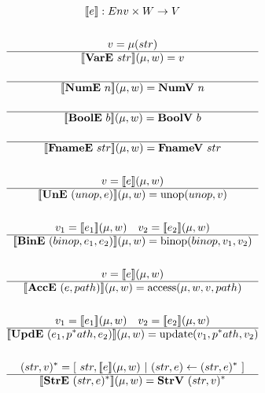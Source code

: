 \begin{gather*}
  \sem{e} : Env \times W \rightarrow V \\
%
\newline \\
  v = \mu(str) \\
  \hline
  \sem{\vare ~ str}(\mu, w) = v \\
%
\newline \\
  \hline
  \sem{\nume ~ n}(\mu, w) = \numv ~ n \\
%
\newline \\
  \hline
  \sem{\boole ~ b}(\mu, w) = \boolv ~ b \\
%
\newline \\
  \hline
  \sem{\fnamee ~ str}(\mu, w) = \fnamev ~ str \\
%
\newline \\
  v = \sem{e}(\mu, w) \\
  \hline
  \sem{\une ~ (unop, e)}(\mu, w) = \unop(unop, v) \\
%
\newline \\
  v_1 = \sem{e_1}(\mu, w) \quad v_2 = \sem{e_2}(\mu, w) \\
  \hline
  \sem{\bine ~ (binop, e_1, e_2)}(\mu, w) = \binop(binop, v_1, v_2) \\
%
\newline \\
  v = \sem{e}(\mu, w) \\
  \hline
  \sem{\acce ~ (e, path)}(\mu, w) = \access(\mu, w, v, path) \\
%
\newline \\
  v_1 = \sem{e_1}(\mu, w) \quad v_2 = \sem{e_2}(\mu, w) \\
  \hline
  \sem{\upde ~ (e_1, \seq path, e_2)}(\mu, w) = \update(v_1, \seq path, v_2) \\
%
\newline \\
  \seq{(str, v)} = [ ~ str, \sem{e}(\mu, w) ~ | ~  (str, e) \leftarrow \seq{(str, e)} ~ ] \\
  \hline
  \sem{\stre ~ \seq{(str, e)}}(\mu, w) = \strv ~ \seq{(str, v)} \\
%
\newline \\

\end{gather*}
